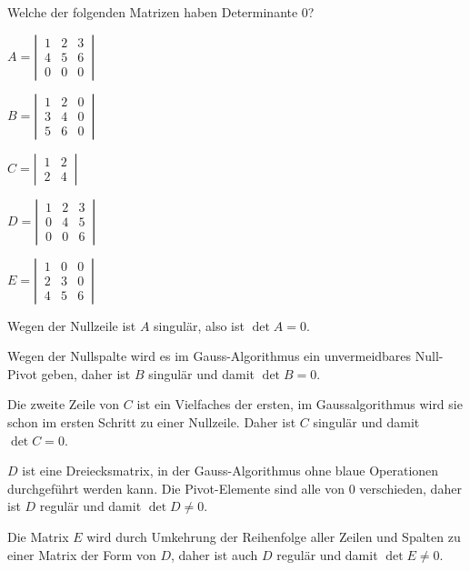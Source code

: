 Welche der folgenden Matrizen haben Determinante 0?
\begin{teilaufgaben}
\item  $A = \left|\,\begin{matrix}1&2&3\\4&5&6\\0&0&0\end{matrix}\,\right|$
\item  $B = \left|\,\begin{matrix}1&2&0\\3&4&0\\5&6&0\end{matrix}\,\right|$
\item  $C = \left|\,\begin{matrix}1&2\\2&4\end{matrix}\,\right|$
\item  $D = \left|\,\begin{matrix}1&2&3\\0&4&5\\0&0&6\end{matrix}\,\right|$
\item  $E = \left|\,\begin{matrix}1&0&0\\2&3&0\\4&5&6\end{matrix}\,\right|$
\end{teilaufgaben}


\begin{loesung}
\begin{teilaufgaben}
\item
Wegen der Nullzeile ist $A$ singulär, also ist $\det A = 0$.
\item
Wegen der Nullspalte wird es im Gauss-Algorithmus ein unvermeidbares 
Null-Pivot geben, daher ist $B$ singulär und damit $\det B = 0$.
\item
Die zweite Zeile von $C$ ist ein Vielfaches der ersten,
im Gaussalgorithmus wird sie schon im ersten Schritt zu einer Nullzeile.
Daher ist $C$ singulär und damit$\det C = 0$.
\item
$D$ ist eine Dreiecksmatrix, in der Gauss-Algorithmus ohne blaue Operationen
durchgeführt werden kann.
Die Pivot-Elemente sind alle von 0 verschieden, daher ist $D$ regulär
und damit $\det D \ne 0$.
\item
Die Matrix $E$ wird durch Umkehrung der Reihenfolge aller Zeilen und
Spalten zu einer Matrix der Form von $D$, daher ist auch $D$ regulär
und damit $\det E \ne 0$.
\qedhere
\end{teilaufgaben}
\end{loesung}
